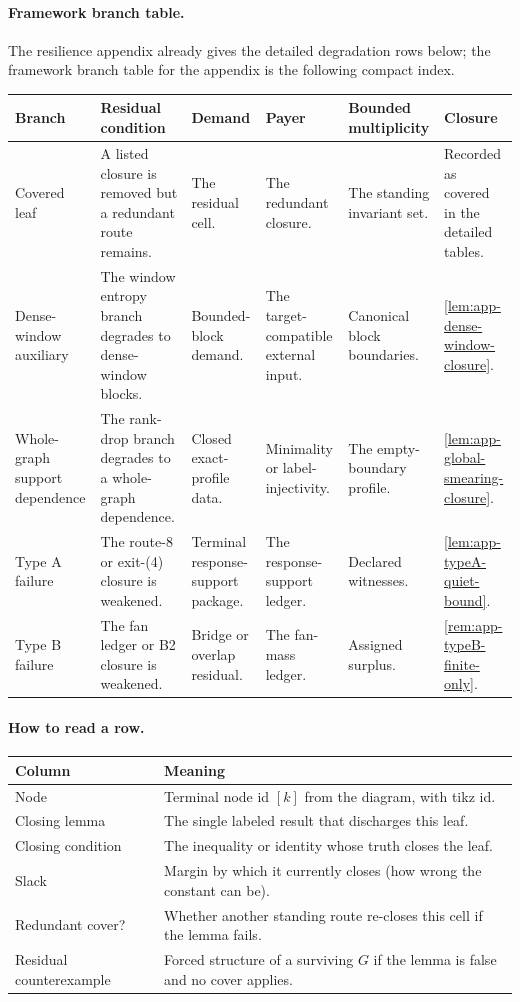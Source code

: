\documentclass[11pt]{article}
\newcommand{\FrameworkBranchTableHeader}{%
\toprule
\textbf{Branch} & \textbf{Residual condition} & \textbf{Demand} & \textbf{Payer} & \textbf{Bounded multiplicity} & \textbf{Closure}\\
\midrule
}
\begin{document}
\paragraph{Framework branch table.}
The resilience appendix already gives the detailed degradation rows below; the
framework branch table for the appendix is the following compact index.
\begin{longtable}{L{0.13\textwidth} L{0.19\textwidth} L{0.14\textwidth} L{0.14\textwidth} L{0.17\textwidth} L{0.17\textwidth}}
\FrameworkBranchTableHeader
Covered leaf
&
A listed closure is removed but a redundant route remains.
&
The residual cell.
&
The redundant closure.
&
The standing invariant set.
&
Recorded as covered in the detailed tables.
\\
\addlinespace
Dense-window auxiliary
&
The window entropy branch degrades to dense-window blocks.
&
Bounded-block demand.
&
The target-compatible external input.
&
Canonical block boundaries.
&
\cref{lem:app-dense-window-closure}.
\\
\addlinespace
Whole-graph support dependence
&
The rank-drop branch degrades to a whole-graph dependence.
&
Closed exact-profile data.
&
Minimality or label-injectivity.
&
The empty-boundary profile.
&
\cref{lem:app-global-smearing-closure}.
\\
\addlinespace
Type A failure
&
The route-8 or exit-\textup{(4)} closure is weakened.
&
Terminal response-support package.
&
The response-support ledger.
&
Declared witnesses.
&
\cref{lem:app-typeA-quiet-bound}.
\\
\addlinespace
Type B failure
&
The fan ledger or B2 closure is weakened.
&
Bridge or overlap residual.
&
The fan-mass ledger.
&
Assigned surplus.
&
\cref{rem:app-typeB-finite-only}.
\\
\bottomrule
\end{longtable}

\paragraph{How to read a row.}
{\small
\begin{longtable}{L{0.22\textwidth} L{0.70\textwidth}}
\toprule
\textbf{Column} & \textbf{Meaning} \\
\midrule
\endhead
Node & Terminal node id $[k]$ from the diagram, with tikz id. \\
Closing lemma & The single labeled result that discharges this leaf. \\
Closing condition & The inequality or identity whose truth closes the leaf. \\
Slack & Margin by which it currently closes (how wrong the constant can be). \\
Redundant cover? & Whether another standing route re-closes this cell if the lemma fails. \\
Residual counterexample & Forced structure of a surviving $G$ if the lemma is false and no cover applies. \\
\bottomrule
\end{longtable}
}
\end{document}
